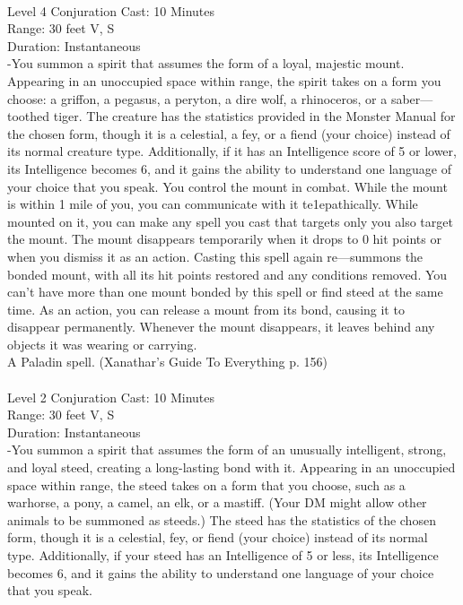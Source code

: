 \documentclass[10pt,twocolumn]{report}
\begin{document}
 \\
Level 4 \quad Conjuration \quad Cast: 10 Minutes\\
Range: 30 feet \quad V, S\\
Duration: Instantaneous \quad \\
-You summon a spirit that assumes the form of a loyal, majestic mount. Appearing in an unoccupied space within range, the spirit takes on a form you choose: a griffon, a pegasus, a peryton, a dire wolf, a rhinoceros, or a saber—toothed tiger. The creature has the statistics provided in the Monster Manual for the chosen form, though it is a celestial, a fey, or a fiend (your choice) instead of its normal creature type. Additionally, if it has an Intelligence score of 5 or lower, its Intelligence becomes 6, and it gains the ability to understand one language of your choice that you speak. You control the mount in combat. While the mount is within 1 mile of you, you can communicate with it te1epathically. While mounted on it, you can make any spell you cast that targets only you also target the mount. The mount disappears temporarily when it drops to 0 hit points or when you dismiss it as an action. Casting this spell again re—summons the bonded mount, with all its hit points restored and any conditions removed. You can’t have more than one mount bonded by this spell or find steed at the same time. As an action, you can release a mount from its bond, causing it to disappear permanently. Whenever the mount disappears, it leaves behind any objects it was wearing or carrying.\\
A Paladin spell. (Xanathar's Guide To Everything p. 156) \\


 \\
Level 2 \quad Conjuration \quad Cast: 10 Minutes\\
Range: 30 feet \quad V, S\\
Duration: Instantaneous \quad \\
-You summon a spirit that assumes the form of an unusually intelligent, strong, and loyal steed, creating a long-lasting bond with it. Appearing in an unoccupied space within range, the steed takes on a form that you choose, such as a warhorse, a pony, a camel, an elk, or a mastiff. (Your DM might allow other animals to be summoned as steeds.) The steed has the statistics of the chosen form, though it is a celestial, fey, or fiend (your choice) instead of its normal type. Additionally, if your steed has an Intelligence of 5 or less, its Intelligence becomes 6, and it gains the ability to understand one language of your choice that you speak.
\end{document}
